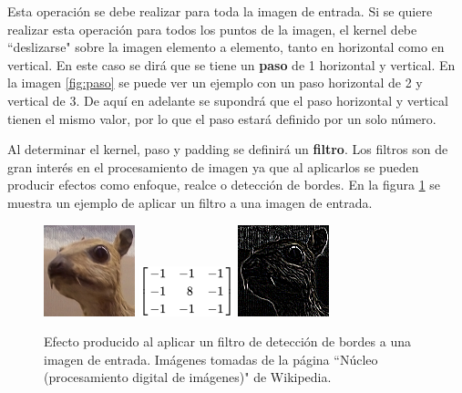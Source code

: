Esta operación se debe realizar para toda la imagen de entrada. Si se quiere realizar esta operación para todos los puntos de la imagen, el kernel debe ``deslizarse" sobre la imagen elemento a elemento, tanto en horizontal como en vertical. En este caso se dirá que se tiene un \textbf{paso} de 1 horizontal y vertical. En la imagen \ref{fig:paso} se puede ver un ejemplo con un paso horizontal de 2 y vertical de 3. De aquí en adelante se supondrá que el paso horizontal y vertical tienen el mismo valor, por lo que el paso estará definido por un solo número.


Al determinar el kernel, paso y padding se definirá un \textbf{filtro}. Los filtros son de gran interés en el procesamiento de imagen ya que al aplicarlos se pueden producir efectos como enfoque, realce o detección de bordes. En la figura \ref{fig:filtro} se muestra un ejemplo de aplicar un filtro a una imagen de entrada.

\begin{figure}[ht]
\centering
\includegraphics[scale=2]{img/filter_og.png}
\includegraphics[scale=1]{img/filter_edge_kernel.png}
\includegraphics[scale=2]{img/filter_edge.png}
\caption[Resultado de aplicar un filtro de reconocimiento de bordes a una imagen.]{Efecto producido al aplicar un filtro de detección de bordes a una imagen de entrada. Imágenes tomadas de la página ``Núcleo (procesamiento digital de imágenes)"\phantom{x} de Wikipedia.}\bigskip
\label{fig:filtro}
\end{figure}

